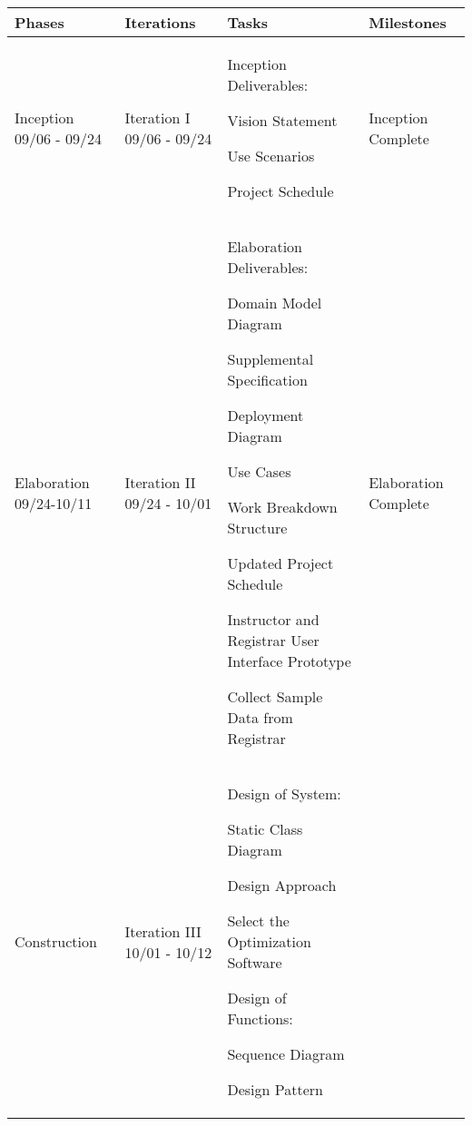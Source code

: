 \documentclass[11pt]{article}
\newenvironment{packed_itemize}{
\begin{itemize}
  \setlength{\itemsep}{1pt}
  \setlength{\parskip}{0pt}
  \setlength{\parsep}{0pt}
}{\end{itemize}}
\begin{document}
\begin{tabular}{|m{0.9in}|m{0.9in}|m{4in}|m{.8in}|}
\hline
\textbf{Phases}  & \textbf{Iterations}  & \textbf{Tasks}        & \textbf{Milestones} \\
\hline\hline
Inception 09/06 - 09/24 &
Iteration I 09/06 - 09/24 & \vspace{0.1in}
Inception Deliverables:
	 \begin{packed_itemize}
	\vspace{-0.15in}
		\item Vision Statement
		\item Use Scenarios
		\item Project Schedule
	\vspace{-0.15in}
	\end{packed_itemize}
	& Inception Complete\\
\hline
Elaboration 09/24-10/11&
Iteration II 09/24 - 10/01&  \vspace{0.1in}
Elaboration Deliverables:
	 \begin{packed_itemize}
	\vspace{-0.15in}
		\item Domain Model Diagram
		\item Supplemental Specification
		\item Deployment Diagram
		\item Use Cases
		\item Work Breakdown Structure
		\item Updated Project Schedule
   \end{packed_itemize}

\raggedright{
Instructor and Registrar User Interface Prototype
}

Collect Sample Data from Registrar
& Elaboration Complete
\\
\hline

\multirow{10}{*}{Construction }
 &
 Iteration III 10/01 - 10/12 & \vspace{0.1in}
 Design of System:
	\begin{packed_itemize}
		\vspace{-0.15in}
		\item Static Class Diagram
		\item Design Approach
		\item Select the Optimization Software
	\end{packed_itemize}

 Design of Functions:
	\begin{packed_itemize}
		\vspace{-0.15in}
		\item Sequence Diagram
		\item  Design Pattern
	\end{packed_itemize}


\end{tabular}
\end{document}
